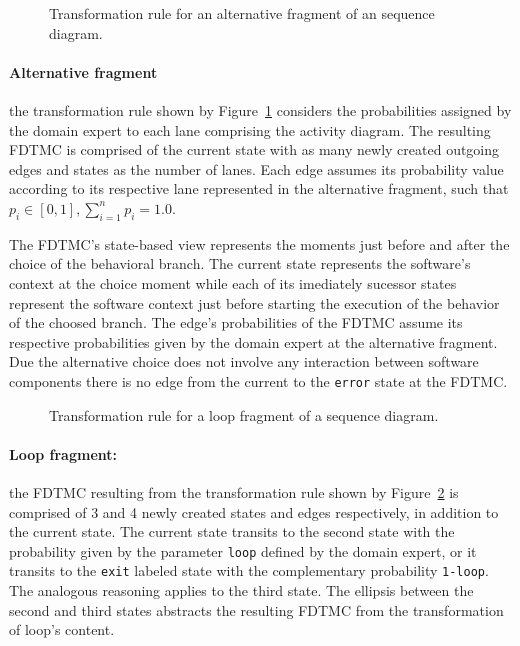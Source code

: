 \begin{figure}[h!]
\begin{center}
\resizebox{!}{4cm}{

}
\end{center}
\caption{Transformation rule for an alternative fragment of an sequence
diagram.}
\label{fig:transAltFrag_SD}
\end{figure}

\paragraph{Alternative fragment \label{par:altFragTransformation}} 
the transformation rule shown by Figure~\ref{fig:transAltFrag_SD} considers the
probabilities assigned by the domain expert to each lane comprising the activity
diagram. The resulting FDTMC is comprised of the current state with as many
newly created outgoing edges and states as the number of lanes. Each edge
assumes its probability value according to its respective lane represented in
the alternative fragment, such that $p_{i} \in [0,1], \sum_{i=1}^{n} p_{i} =
1.0$.

The FDTMC's state-based view represents the moments just before and after the choice of the 
behavioral branch. The current state represents the software's context at
the choice moment while each of its imediately sucessor states represent the
software context just before starting the execution of the behavior of the choosed branch. The edge's probabilities of the FDTMC assume its respective
probabilities given by the domain expert at the alternative fragment. Due the
alternative choice does not involve any interaction between software components
there is no edge from the current to the \texttt{error} state at the FDTMC. 

\begin{figure}[h!]
\begin{center}
\resizebox{!}{4cm}{

}
\end{center}
\caption{Transformation rule for a loop fragment of a sequence diagram.}
\label{fig:transLoopFrag_SD}
\end{figure}


\paragraph{Loop fragment:\label{par:loopFragTransformation}}
the FDTMC resulting from the transformation rule shown by
Figure~\ref{fig:transLoopFrag_SD} is comprised of 3 and 4 newly created states and edges
respectively, in addition to the current state. The current state transits to
the second state with the probability given by the parameter \texttt{loop}
defined by the domain expert, or it transits to the \texttt{exit} labeled state
with the complementary probability \texttt{1-loop}.  The analogous reasoning
applies to the third state. The ellipsis between the second and third states
abstracts the resulting FDTMC from the transformation of loop's content. 

